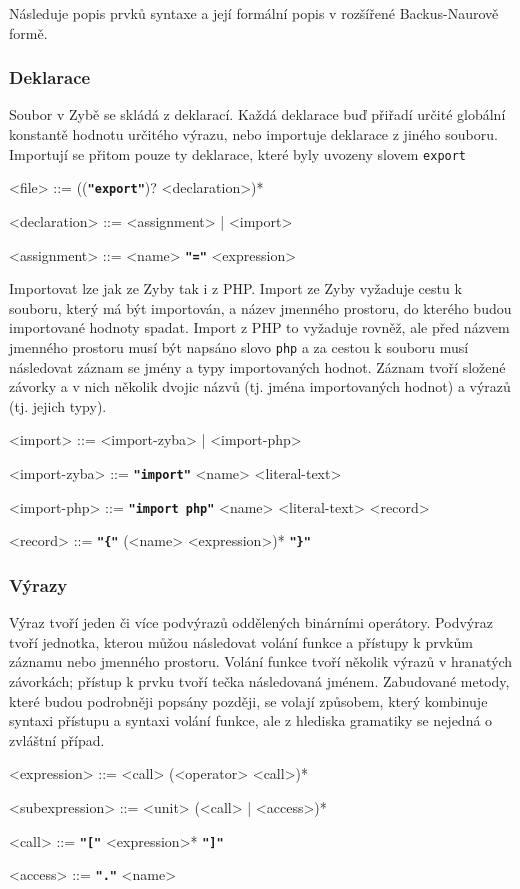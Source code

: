 \documentclass[a4paper,12pt]{article}
\def\quote #1{"#1"}
\def\emphasis #1{\textbf{\texttt{\quote{#1}}}}
\begin{document}
Následuje popis prvků syntaxe a její formální popis v rozšířené Backus-Naurově formě.

\subsubsection{Deklarace}
Soubor v Zybě se skládá z deklarací. Každá deklarace buď přiřadí určité globální konstantě hodnotu určitého výrazu, nebo importuje deklarace z jiného souboru. Importují se přitom pouze ty deklarace, které byly uvozeny slovem \texttt{export}
\begin{grammar}
<file> ::= ((\emphasis{export})? <declaration>)*

<declaration> ::= <assignment> | <import>

<assignment> ::= <name> \emphasis{=} <expression>
\end{grammar}

Importovat lze jak ze Zyby tak i z PHP. Import ze Zyby vyžaduje cestu k souboru, který má být importován, a název jmenného prostoru, do kterého budou importované hodnoty spadat. Import z PHP to vyžaduje rovněž, ale před názvem jmenného prostoru musí být napsáno slovo \texttt{php} a za cestou k souboru musí následovat záznam se jmény a typy importovaných hodnot. Záznam tvoří složené závorky a v nich několik dvojic názvů (tj. jména importovaných hodnot) a výrazů (tj. jejich typy).
\begin{grammar}
<import> ::= <import-zyba> | <import-php>

<import-zyba> ::= \emphasis{import} <name> <literal-text>

<import-php> ::= \emphasis{import php} <name> <literal-text> <record>

<record> ::= \emphasis{\{} (<name> <expression>)* \emphasis{\}}
\end{grammar}

\subsubsection{Výrazy}
Výraz tvoří jeden či více podvýrazů oddělených binárními operátory. Podvýraz tvoří jednotka, kterou můžou následovat volání funkce a přístupy k prvkům záznamu nebo jmenného prostoru. Volání funkce tvoří několik výrazů v hranatých závorkách; přístup k prvku tvoří tečka následovaná jménem. Zabudované metody, které budou podrobněji popsány později, se volají způsobem, který kombinuje syntaxi přístupu a syntaxi volání funkce, ale z hlediska gramatiky se nejedná o zvláštní případ.
\begin{grammar}
<expression> ::= <call> (<operator> <call>)*

<subexpression> ::= <unit> (<call> | <access>)*

<call> ::= \emphasis{[} <expression>* \emphasis{]}

<access> ::= \emphasis{.} <name>
\end{grammar}
\end{document}

